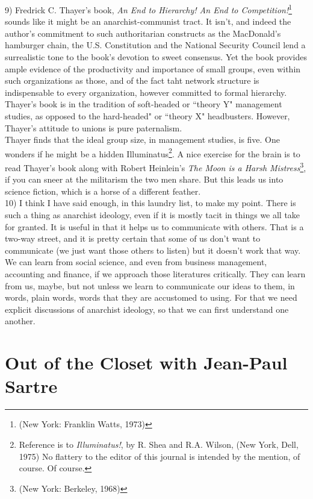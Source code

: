 \documentclass[12pt, onecolumn, letterpaper, oneside]{book}
\begin{document}
9) Fredrick C. Thayer's book, \emph{An End to Hierarchy! An End to Competition!}\footnote{(New York: Franklin Watts, 1973)} sounds like it might be an anarchist-communist tract. It isn't, and indeed the author's commitment to such authoritarian constructs as the MacDonald's hamburger chain, the U.S. Constitution and the National Security Council lend a surrealistic tone to the book's devotion to sweet consensus. Yet the book provides ample evidence of the productivity and importance of small groups, even within such organizations as those, and of the fact taht network structure is indispensable to every organization, however committed to formal hierarchy. Thayer's book is in the tradition of soft-headed or ``theory Y" management studies, as opposed to the hard-headed" or ``theory X" headbusters. However, Thayer's attitude to unions is pure paternalism.\\
Thayer finds that the ideal group size, in management studies, is five. One wonders if he might be a hidden Illuminatus\footnote{Reference is to \emph{Illuminatus!}, by R. Shea and R.A. Wilson, (New York, Dell, 1975) No flattery to the editor of this journal is intended by the mention, of course. Of course.}. A nice exercise for the brain is to read Thayer's book along with Robert Heinlein's \emph{The Moon is a Harsh Mistress}\footnote{(New York: Berkeley, 1968)}, if you can sneer at the militarism the two men share. But this leads us into science fiction, which is a horse of a different feather.\\

10) I think I have said enough, in this laundry list, to make my point. There is such a thing as anarchist ideology, even if it is mostly tacit in things we all take for granted. It is useful in that it helps us to communicate with others. That is a two-way street, and it is pretty certain that some of us don't want to communicate (we just want those others to listen) but it doesn't work that way. We can learn from social science, and even from business management, accounting and finance, if we approach those literatures critically. They can learn from us, maybe, but not unless we learn to communicate our ideas to them, in words, plain words, words that they are accustomed to using. For that we need explicit discussions of anarchist ideology, so that we can first understand one another.\\


\chapter{Out of the Closet with Jean-Paul Sartre}
\end{document}
